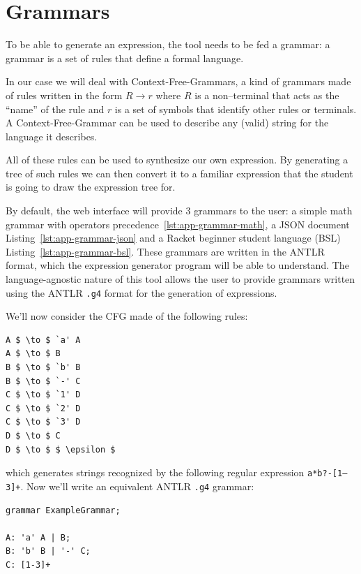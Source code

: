 \documentclass[]{usiinfbachelorproject}
\begin{document}
\newpage

\section{Grammars}\label{user-grammars}


To be able to generate an expression, the tool needs to be fed a grammar: a
grammar is a set of rules that define a formal language.

In our case we will deal with Context-Free-Grammars, a kind of grammars
made of rules written in the form $ R \to r $ where $ R $ is a non–terminal
that acts as the ``name'' of the rule and $ r $ is a set of symbols that
identify other rules or terminals. A Context-Free-Grammar can be used to
describe any (valid) string for the language it describes.

All of these rules can be used to synthesize our own expression. By generating
a tree of such rules we can then convert it to a familiar expression that the
student is going to draw the expression tree for.

By default, the web interface will provide 3 grammars to the user: a
simple math grammar with operators precedence~\ref{lst:app-grammar-math},
a JSON document Listing~\ref{lst:app-grammar-json} and a Racket beginner student
language (BSL) Listing~\ref{lst:app-grammar-bsl}. These grammars are written in
the ANTLR format, which the expression generator program will be able to
understand. The language-agnostic nature of this tool allows the user to
provide grammars written using the ANTLR \texttt{.g4} format for the
generation of expressions.

We'll now consider the CFG made of the following rules\@:

\begin{lstlisting}
A $ \to $ `a' A
A $ \to $ B
B $ \to $ `b' B
B $ \to $ `-' C
C $ \to $ `1' D
C $ \to $ `2' D
C $ \to $ `3' D
D $ \to $ C
D $ \to $ $ \epsilon $
\end{lstlisting}

which generates strings recognized by the following regular expression
\texttt{a*b?-[1–3]+}. Now we'll write an equivalent ANTLR \texttt{.g4} grammar:

\begin{lstlisting}[style=antlr]
grammar ExampleGrammar;

A: 'a' A | B;
B: 'b' B | '-' C;
C: [1-3]+
\end{lstlisting}
\end{document}
